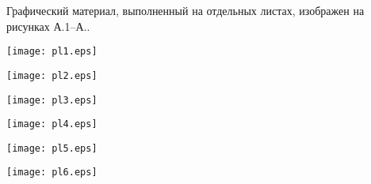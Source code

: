 
Графический материал, выполненный на отдельных листах,
изображен на рисунках А.1--А..
\setcounter{числоПлакатов}{0}

\renewcommand{\thefigure}{А.\arabic{figure}} %

\begin{landscape}

\begin{плакат}
    \texttt{[image: pl1.eps]}
    \label{pl1:image}      
\end{плакат}

\begin{плакат}
    \texttt{[image: pl2.eps]}
    \label{pl2:image}      
\end{плакат}

\begin{плакат}
    \texttt{[image: pl3.eps]}
    \label{pl3:image}      
\end{плакат}

\begin{плакат}
    \texttt{[image: pl4.eps]}
    \label{pl4:image}      
\end{плакат}

\begin{плакат}
	\texttt{[image: pl5.eps]}
	\label{pl5:image}      
\end{плакат}

\begin{плакат}
	\texttt{[image: pl6.eps]}
	\label{pl6:image}      
\end{плакат}

\end{landscape}
